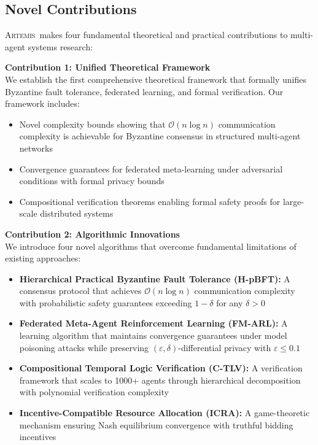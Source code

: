 \documentclass[conference]{IEEEtran}
\newcommand{\artemis}{\textsc{Artemis}}
\newcommand{\bigO}{\mathcal{O}}
\newcommand{\epsilon}{\varepsilon}
\begin{document}
\subsection{Novel Contributions}

\artemis\ makes four fundamental theoretical and practical contributions to multi-agent systems research:

\textbf{Contribution 1: Unified Theoretical Framework}\\
We establish the first comprehensive theoretical framework that formally unifies Byzantine fault tolerance, federated learning, and formal verification. Our framework includes:
\begin{itemize}
    \item Novel complexity bounds showing that $\bigO(n \log n)$ communication complexity is achievable for Byzantine consensus in structured multi-agent networks
    \item Convergence guarantees for federated meta-learning under adversarial conditions with formal privacy bounds
    \item Compositional verification theorems enabling formal safety proofs for large-scale distributed systems
\end{itemize}

\textbf{Contribution 2: Algorithmic Innovations}\\
We introduce four novel algorithms that overcome fundamental limitations of existing approaches:
\begin{itemize}
    \item \textbf{Hierarchical Practical Byzantine Fault Tolerance (H-pBFT):} A consensus protocol that achieves $\bigO(n \log n)$ communication complexity with probabilistic safety guarantees exceeding $1-\delta$ for any $\delta > 0$
    \item \textbf{Federated Meta-Agent Reinforcement Learning (FM-ARL):} A learning algorithm that maintains convergence guarantees under model poisoning attacks while preserving $(\epsilon,\delta)$-differential privacy with $\epsilon \leq 0.1$
    \item \textbf{Compositional Temporal Logic Verification (C-TLV):} A verification framework that scales to 1000+ agents through hierarchical decomposition with polynomial verification complexity
    \item \textbf{Incentive-Compatible Resource Allocation (ICRA):} A game-theoretic mechanism ensuring Nash equilibrium convergence with truthful bidding incentives
\end{itemize}
\end{document}

